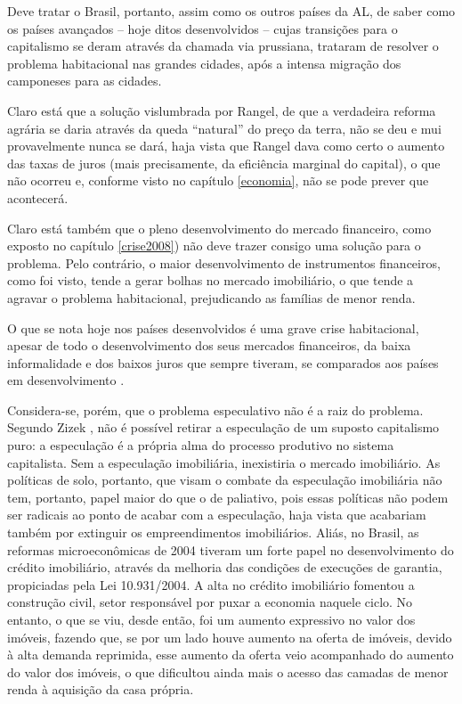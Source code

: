 \documentclass[
	12pt,				%
	oneside,			%
	a4paper,			%
	chapter=TITLE,		%
	section=TITLE,		%
	english,			%
	brazil				%
	]{abntex2}
\begin{document}
\begin{refsection}
Deve tratar o Brasil, portanto, assim como os outros países da \gls{AL},
de saber como os países avançados -- hoje ditos desenvolvidos -- cujas
transições para o capitalismo se deram através da chamada via prussiana,
trataram de resolver o problema habitacional nas grandes cidades, após a intensa
migração dos camponeses para as cidades.

Claro está que a solução vislumbrada por Rangel, de que a verdadeira reforma
agrária se daria através da queda ``natural'' do preço da terra, não se deu e mui
provavelmente nunca se dará, haja vista que Rangel dava como certo o aumento das
taxas de juros (mais precisamente, da eficiência marginal do capital), o que não
ocorreu e, conforme visto no capítulo \ref{economia}, não se pode prever que
acontecerá.

Claro está também que o pleno desenvolvimento do mercado financeiro, como
exposto no capítulo \ref{crise2008}) não deve trazer consigo
uma solução para o problema. Pelo contrário, o maior desenvolvimento de
instrumentos financeiros, como foi visto, tende a gerar bolhas no mercado
imobiliário, o que tende a agravar o problema habitacional, prejudicando as
famílias de menor renda.

O que se nota hoje nos países desenvolvidos é uma grave crise habitacional,
apesar de todo o desenvolvimento dos seus mercados financeiros, da baixa
informalidade e dos baixos juros que sempre tiveram, se comparados aos países em
desenvolvimento \autocites{housing-europe}{california}.

Considera-se, porém, que o problema especulativo não é a raiz do problema.
Segundo Zizek \autocite*[220-221]{zizek2005}, não é possível retirar a especulação de um
suposto capitalismo puro: a especulação é a própria alma do processo produtivo
no sistema capitalista. Sem a especulação imobiliária, inexistiria o mercado
imobiliário. As políticas de solo, portanto, que visam o combate da especulação
imobiliária não tem, portanto, papel maior do que o de paliativo, pois essas
políticas não podem ser radicais ao ponto de acabar com a especulação, haja
vista que acabariam também por extinguir os empreendimentos imobiliários. Aliás,
no Brasil, as reformas microeconômicas de 2004 tiveram um forte papel no
desenvolvimento do crédito imobiliário, através da melhoria das condições de
execuções de garantia, propiciadas pela Lei 10.931/2004. A alta no crédito
imobiliário fomentou a construção civil, setor responsável por puxar a economia
naquele ciclo. No entanto, o que se viu, desde então, foi um aumento expressivo
no valor dos imóveis, fazendo que, se por um lado houve aumento na oferta de
imóveis, devido à alta demanda reprimida, esse aumento da oferta veio
acompanhado do aumento do valor dos imóveis, o que dificultou ainda mais o
acesso das camadas de menor renda à aquisição da casa própria.


\end{refsection}
\end{document}
